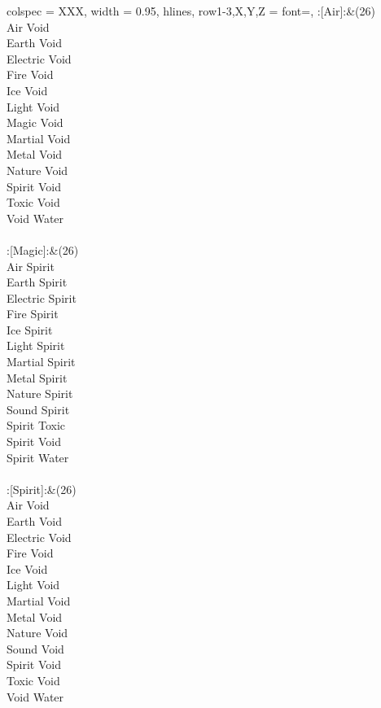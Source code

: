 \begin{longtblr}[
	caption = {1v2 Attacking Effective},
	label = {1v2-Attacking-Effective},
]{
	colspec = {XXX}, width = 0.95\linewidth,
	hlines,
	row{1-3,X,Y,Z} = {font=\bfseries},
}
	:[Air]:&{(26)\\
	Air Void \\
	Earth Void \\
	Electric Void \\
	Fire Void \\
	Ice Void \\
	Light Void \\
	Magic Void \\
	Martial Void \\
	Metal Void \\
	Nature Void \\
	Spirit Void \\
	Toxic Void \\
	Void Water \\
	}\\

	:[Magic]:&{(26)\\
	Air Spirit \\
	Earth Spirit \\
	Electric Spirit \\
	Fire Spirit \\
	Ice Spirit \\
	Light Spirit \\
	Martial Spirit \\
	Metal Spirit \\
	Nature Spirit \\
	Sound Spirit \\
	Spirit Toxic \\
	Spirit Void \\
	Spirit Water \\
	}\\

	:[Spirit]:&{(26)\\
	Air Void \\
	Earth Void \\
	Electric Void \\
	Fire Void \\
	Ice Void \\
	Light Void \\
	Martial Void \\
	Metal Void \\
	Nature Void \\
	Sound Void \\
	Spirit Void \\
	Toxic Void \\
	Void Water \\
	}\\

\end{longtblr}
\onecolumn
